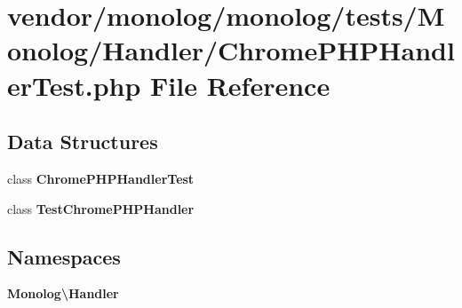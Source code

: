 \section{vendor/monolog/monolog/tests/\+Monolog/\+Handler/\+Chrome\+P\+H\+P\+Handler\+Test.php File Reference}
\label{_chrome_p_h_p_handler_test_8php}
\subsection*{Data Structures}
\begin{DoxyCompactItemize}
\item 
class {\bf Chrome\+P\+H\+P\+Handler\+Test}
\item 
class {\bf Test\+Chrome\+P\+H\+P\+Handler}
\end{DoxyCompactItemize}
\subsection*{Namespaces}
\begin{DoxyCompactItemize}
\item 
 {\bf Monolog\textbackslash{}\+Handler}
\end{DoxyCompactItemize}
